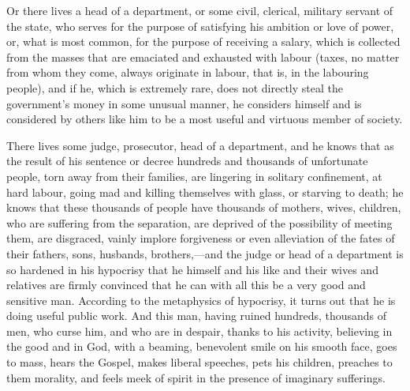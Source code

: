 \documentclass{book}
\begin{document}
Or there lives a head of a department, or some civil, clerical, military servant of the state, who serves for the purpose of satisfying his ambition or love of power, or, what is most common, for the purpose of receiving a salary, which is collected from the masses that are emaciated and exhausted with labour (taxes, no matter from whom they come, always originate in labour, that is, in the labouring people), and if he, which is extremely rare, does not directly steal the government’s money in some unusual manner, he considers himself and is considered by others like him to be a most useful and virtuous member of society.

There lives some judge, prosecutor, head of a department, and he knows that as the result of his sentence or decree hundreds and thousands of unfortunate people, torn away from their families, are lingering in solitary confinement, at hard labour, going mad and killing themselves with glass, or starving to death; he knows that these thousands of people have thousands of mothers, wives, children, who are suffering from the separation, are deprived of the possibility of meeting them, are disgraced, vainly implore forgiveness or even alleviation of the fates of their fathers, sons, husbands, brothers,—and the judge or head of a department is so hardened in his hypocrisy that he himself and his like and their wives and relatives are firmly convinced that he can with all this be a very good and sensitive man. According to the metaphysics of hypocrisy, it turns out that he is doing useful public work. And this man, having ruined hundreds, thousands of men, who curse him, and who are in despair, thanks to his activity, believing in the good and in God, with a beaming, benevolent smile on his smooth face, goes to mass, hears the Gospel, makes liberal speeches, pets his children, preaches to them morality, and feels meek of spirit in the presence of imaginary sufferings.
\end{document}
